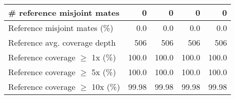 \documentclass[12pt,a4paper]{article}
\begin{document}
\begin{table}[ht]
\begin{center}
\begin{tabular}{|l*{4}{|r}|}
\# reference misjoint mates & 0 & 0 & 0 & 0 \\ \hline
Reference misjoint mates (\%) & 0.0 & 0.0 & 0.0 & 0.0 \\ \hline
Reference avg. coverage depth & 506 & 506 & 506 & 506 \\ \hline
Reference coverage $\geq$ 1x (\%) & 100.0 & 100.0 & 100.0 & 100.0 \\ \hline
Reference coverage $\geq$ 5x (\%) & 100.0 & 100.0 & 100.0 & 100.0 \\ \hline
Reference coverage $\geq$ 10x (\%) & 99.98 & 99.98 & 99.98 & 99.98 \\ \hline
\end{tabular}
\end{center}
\end{table}
\end{document}
